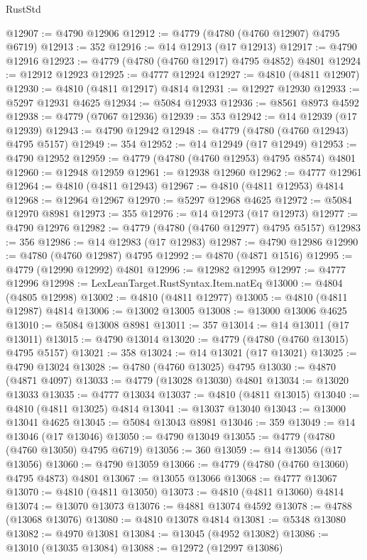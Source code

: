 \begin{lexlean}{RustStd}
\begin{coremodule}
@12907 := @4790 @12906
@12912 := @4779 (@4780 (@4760 @12907) @4795 @6719)
@12913 := 352
@12916 := @14 @12913 (@17 @12913)
@12917 := @4790 @12916
@12923 := @4779 (@4780 (@4760 @12917) @4795 @4852) @4801
@12924 := @12912 @12923
@12925 := @4777 @12924
@12927 := @4810 (@4811 @12907)
@12930 := @4810 (@4811 @12917) @4814
@12931 := @12927 @12930
@12933 := @5297 @12931 @4625
@12934 := @5084 @12933
@12936 := @8561 @8973 @4592
@12938 := @4779 (@7067 @12936)
@12939 := 353
@12942 := @14 @12939 (@17 @12939)
@12943 := @4790 @12942
@12948 := @4779 (@4780 (@4760 @12943) @4795 @5157)
@12949 := 354
@12952 := @14 @12949 (@17 @12949)
@12953 := @4790 @12952
@12959 := @4779 (@4780 (@4760 @12953) @4795 @8574) @4801
@12960 := @12948 @12959
@12961 := @12938 @12960
@12962 := @4777 @12961
@12964 := @4810 (@4811 @12943)
@12967 := @4810 (@4811 @12953) @4814
@12968 := @12964 @12967
@12970 := @5297 @12968 @4625
@12972 := @5084 @12970 @8981
@12973 := 355
@12976 := @14 @12973 (@17 @12973)
@12977 := @4790 @12976
@12982 := @4779 (@4780 (@4760 @12977) @4795 @5157)
@12983 := 356
@12986 := @14 @12983 (@17 @12983)
@12987 := @4790 @12986
@12990 := @4780 (@4760 @12987) @4795
@12992 := @4870 (@4871 @1516)
@12995 := @4779 (@12990 @12992) @4801
@12996 := @12982 @12995
@12997 := @4777 @12996
@12998 := LexLeanTarget.RustSyntax.Item.natEq
@13000 := @4804 (@4805 @12998)
@13002 := @4810 (@4811 @12977)
@13005 := @4810 (@4811 @12987) @4814
@13006 := @13002 @13005
@13008 := @13000 @13006 @4625
@13010 := @5084 @13008 @8981
@13011 := 357
@13014 := @14 @13011 (@17 @13011)
@13015 := @4790 @13014
@13020 := @4779 (@4780 (@4760 @13015) @4795 @5157)
@13021 := 358
@13024 := @14 @13021 (@17 @13021)
@13025 := @4790 @13024
@13028 := @4780 (@4760 @13025) @4795
@13030 := @4870 (@4871 @4097)
@13033 := @4779 (@13028 @13030) @4801
@13034 := @13020 @13033
@13035 := @4777 @13034
@13037 := @4810 (@4811 @13015)
@13040 := @4810 (@4811 @13025) @4814
@13041 := @13037 @13040
@13043 := @13000 @13041 @4625
@13045 := @5084 @13043 @8981
@13046 := 359
@13049 := @14 @13046 (@17 @13046)
@13050 := @4790 @13049
@13055 := @4779 (@4780 (@4760 @13050) @4795 @6719)
@13056 := 360
@13059 := @14 @13056 (@17 @13056)
@13060 := @4790 @13059
@13066 := @4779 (@4780 (@4760 @13060) @4795 @4873) @4801
@13067 := @13055 @13066
@13068 := @4777 @13067
@13070 := @4810 (@4811 @13050)
@13073 := @4810 (@4811 @13060) @4814
@13074 := @13070 @13073
@13076 := @4881 @13074 @4592
@13078 := @4788 (@13068 @13076)
@13080 := @4810 @13078 @4814
@13081 := @5348 @13080
@13082 := @4970 @13081
@13084 := @13045 (@4952 @13082)
@13086 := @13010 (@13035 @13084)
@13088 := @12972 (@12997 @13086)

\end{coremodule}
\end{lexlean}
